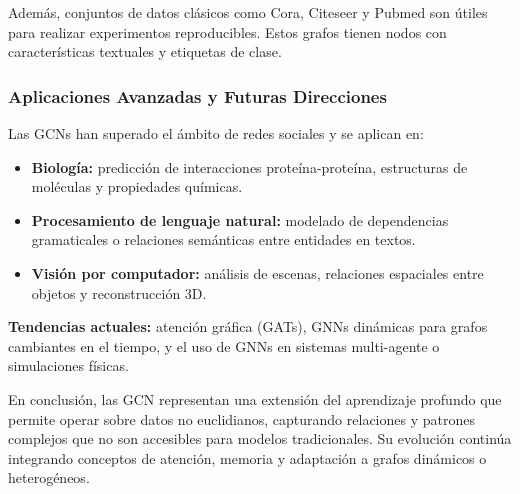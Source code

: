 \documentclass[11pt]{article} %
\begin{document}
Además, conjuntos de datos clásicos como Cora, Citeseer y Pubmed son útiles para realizar experimentos reproducibles. Estos grafos tienen nodos con características textuales y etiquetas de clase.

\subsubsection{Aplicaciones Avanzadas y Futuras Direcciones}

Las GCNs han superado el ámbito de redes sociales y se aplican en:

\begin{itemize}
    \item \textbf{Biología:} predicción de interacciones proteína-proteína, estructuras de moléculas y propiedades químicas.
    \item \textbf{Procesamiento de lenguaje natural:} modelado de dependencias gramaticales o relaciones semánticas entre entidades en textos.
    \item \textbf{Visión por computador:} análisis de escenas, relaciones espaciales entre objetos y reconstrucción 3D.
\end{itemize}

\textbf{Tendencias actuales:} atención gráfica (GATs), GNNs dinámicas para grafos cambiantes en el tiempo, y el uso de GNNs en sistemas multi-agente o simulaciones físicas.

\vspace{10pt}
\noindent En conclusión, las GCN representan una extensión del aprendizaje profundo que permite operar sobre datos no euclidianos, capturando relaciones y patrones complejos que no son accesibles para modelos tradicionales. Su evolución continúa integrando conceptos de atención, memoria y adaptación a grafos dinámicos o heterogéneos.
\end{document}
